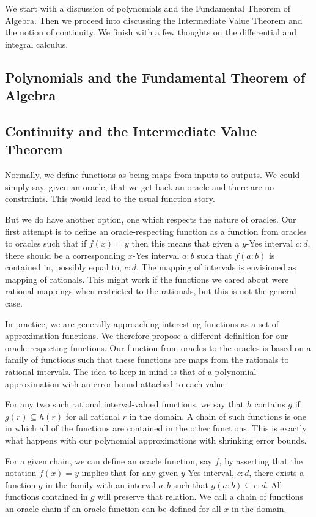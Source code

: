 \documentclass[12pt]{article}
\theoremstyle{remark}
\begin{document}
We start with a discussion of polynomials and the Fundamental Theorem of Algebra. Then we proceed into discussing the Intermediate Value Theorem and the notion of continuity. We finish with a few thoughts on the differential and integral calculus. 

\subsection{Polynomials and the Fundamental Theorem of Algebra}

\subsection{Continuity and the Intermediate Value Theorem}

Normally, we define functions as being maps from inputs to outputs. We could simply say, given an oracle, that we get back an oracle and there are no constraints. This would lead to the usual function story. 

But we do have another option, one which respects the nature of oracles. Our first attempt is to define an oracle-respecting function as a function from oracles to oracles such that if $f(x) = y$ then this means that given a $y$-Yes interval $c:d$, there should be a corresponding $x$-Yes interval $a:b$ such that $f(a:b)$ is contained in, possibly equal to, $c:d$. The mapping of intervals is envisioned as mapping of rationals. This might work if the functions we cared about were rational mappings when restricted to the rationals, but this is not the general case. 

In practice, we are generally approaching interesting functions as a set of approximation functions. We therefore propose a different definition for our oracle-respecting functions. Our function from oracles to the oracles is based on a family of functions such that these functions are maps from the rationals to rational intervals. The idea to keep in mind is that of a polynomial approximation with an error bound attached to each value. 

For any two such rational interval-valued functions, we say that $h$ contains $g$ if $g(r) \subseteq h(r)$ for all rational $r$ in the domain. A chain of such functions is one in which all of the functions are contained in the other functions. This is exactly what happens with our polynomial approximations with shrinking error bounds.

For a given chain, we can define an oracle function, say $f$, by asserting that the notation $f(x) = y$ implies that for any given $y$-Yes interval, $c:d$, there exists a function $g$ in the family with an interval $a:b$ such that $g(a:b) \subseteq c:d$. All functions contained in $g$ will preserve that relation. We call a chain of functions an oracle chain if an oracle function can be defined for all $x$ in the domain.
\end{document}
